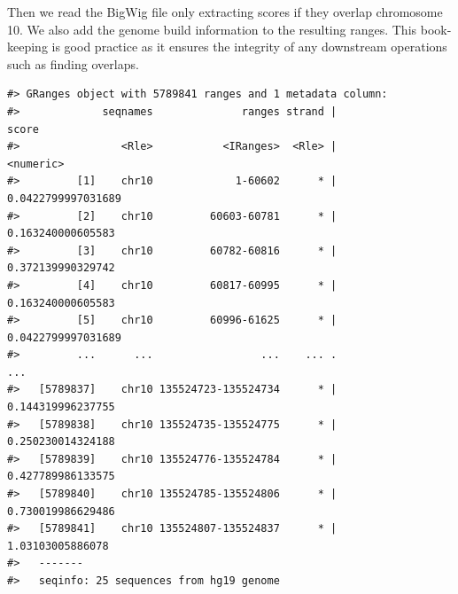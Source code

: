\documentclass[]{article}
\newenvironment{Shaded}{\begin{snugshade}}{\end{snugshade}}
\newcommand{\DataTypeTok}[1]{\textcolor[rgb]{0.13,0.29,0.53}{#1}}
\newcommand{\KeywordTok}[1]{\textcolor[rgb]{0.13,0.29,0.53}{\textbf{#1}}}
\newcommand{\NormalTok}[1]{#1}
\newcommand{\OperatorTok}[1]{\textcolor[rgb]{0.81,0.36,0.00}{\textbf{#1}}}
\newcommand{\StringTok}[1]{\textcolor[rgb]{0.31,0.60,0.02}{#1}}
\begin{document}
\begin{Shaded}
\end{Shaded}

Then we read the BigWig file only extracting scores if they overlap
chromosome 10. We also add the genome build information to the resulting
ranges. This book-keeping is good practice as it ensures the integrity
of any downstream operations such as finding overlaps.

\begin{Shaded}
\end{Shaded}

\begin{verbatim}
#> GRanges object with 5789841 ranges and 1 metadata column:
#>             seqnames              ranges strand |              score
#>                <Rle>           <IRanges>  <Rle> |          <numeric>
#>         [1]    chr10             1-60602      * | 0.0422799997031689
#>         [2]    chr10         60603-60781      * |  0.163240000605583
#>         [3]    chr10         60782-60816      * |  0.372139990329742
#>         [4]    chr10         60817-60995      * |  0.163240000605583
#>         [5]    chr10         60996-61625      * | 0.0422799997031689
#>         ...      ...                 ...    ... .                ...
#>   [5789837]    chr10 135524723-135524734      * |  0.144319996237755
#>   [5789838]    chr10 135524735-135524775      * |  0.250230014324188
#>   [5789839]    chr10 135524776-135524784      * |  0.427789986133575
#>   [5789840]    chr10 135524785-135524806      * |  0.730019986629486
#>   [5789841]    chr10 135524807-135524837      * |   1.03103005886078
#>   -------
#>   seqinfo: 25 sequences from hg19 genome
\end{verbatim}
\end{document}
